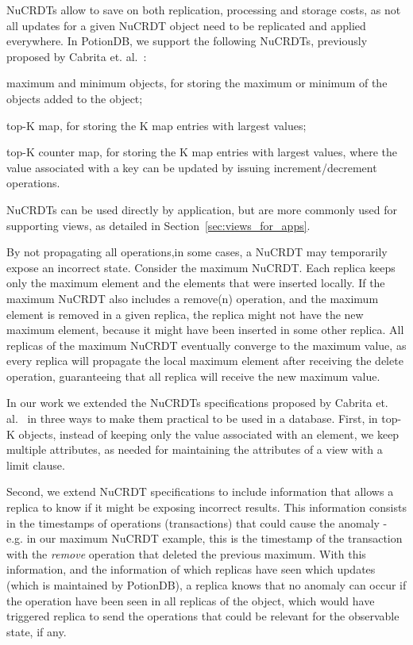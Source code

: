 \documentclass[sigconf, nonacm]{acmart}
\newcommand{\code}[1]{\textsf{\small{#1}}}
\begin{document}
NuCRDTs allow to save on both replication, processing and storage costs, as not all updates for a given NuCRDT object need 
to be replicated and applied everywhere.
In PotionDB, we support the following NuCRDTs, previously proposed by Cabrita et. al.~\cite{Cabrita17Nonuniform}: 
\begin{inparaenum}[(i)]
\item maximum and minimum objects, for storing the maximum or minimum of the objects added to the object;
\item top-K map,  for storing the K map entries with largest values;
\item top-K counter map,  for storing the K map entries with largest values, where the value associated 
with a key can be updated by issuing increment/decrement operations.
\end{inparaenum}
NuCRDTs can be used directly by application, but are more commonly used for supporting 
views, as detailed in Section~\ref{sec:views_for_apps}. 

By not propagating all operations,in some cases, a NuCRDT may temporarily expose an incorrect state.
Consider the maximum NuCRDT.  Each replica keeps only the maximum element and 
the elements that were inserted locally. If the maximum NuCRDT also includes a \code{remove(n)} operation,
and the maximum element is removed in a given replica, the replica might not have the new maximum element,
because it might have been inserted in some other replica.  All replicas of the maximum NuCRDT eventually 
converge to the maximum value, as every replica will propagate the local maximum element after receiving the 
delete operation, guaranteeing that all replica will receive the new maximum value.

In our work we extended the NuCRDTs specifications proposed by Cabrita et. al.~\cite{Cabrita17Nonuniform}
in three ways to make them practical to be used in a database.
First, in top-K objects,  instead of keeping only the value associated with an element,  we keep multiple
attributes, as needed for maintaining the attributes of a view with a limit clause.

Second, we extend NuCRDT specifications to include information that allows a replica to know
if it might be exposing incorrect results. 
This information consists in the timestamps of operations (transactions) that could 
cause the anomaly - e.g. in our maximum NuCRDT example, this is the timestamp of the transaction with the 
\emph{remove} operation that deleted the previous maximum. 
With this information, and the information of which replicas have seen which updates (which is maintained
by PotionDB), a replica knows that no anomaly can occur if the operation have been seen in all replicas of the object, 
which would have triggered replica to send the operations that could be relevant for the observable state, if any.
 
\end{document}

